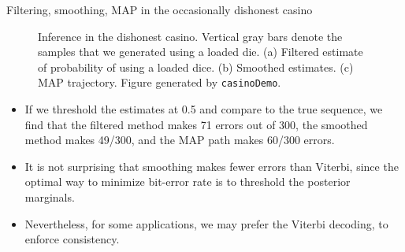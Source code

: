 \documentclass[10pt,mathserif]{beamer}
\begin{document}
\begin{frame}{Filtering, smoothing, MAP in the occasionally dishonest casino}
\begin{figure}[h]
\centering     %
{}
\caption{Inference in the dishonest casino. Vertical gray bars denote the samples that we generated using a loaded die. (a) Filtered estimate of probability of using a loaded dice. (b) Smoothed estimates. (c) MAP trajectory. Figure generated by \texttt{casinoDemo}.}
\end{figure}

\begin{itemize}
    \item If we threshold the estimates at 0.5 and compare to the true sequence, we find that the filtered method makes 71 errors out of 300, the smoothed method makes 49/300, and the MAP path makes 60/300 errors.
    \item It is not surprising that smoothing makes fewer errors than Viterbi, since the optimal way to minimize bit-error rate is to threshold the posterior marginals.
    \item Nevertheless, for some applications, we may prefer the Viterbi decoding, to enforce consistency.
\end{itemize}
\end{frame}
\end{document}
